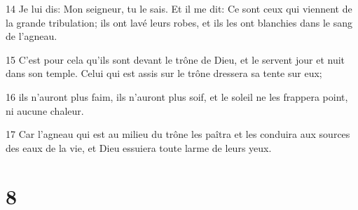 \par 14 Je lui dis: Mon seigneur, tu le sais. Et il me dit: Ce sont ceux qui viennent de la grande tribulation; ils ont lavé leurs robes, et ils les ont blanchies dans le sang de l'agneau.
\par 15 C'est pour cela qu'ils sont devant le trône de Dieu, et le servent jour et nuit dans son temple. Celui qui est assis sur le trône dressera sa tente sur eux;
\par 16 ils n'auront plus faim, ils n'auront plus soif, et le soleil ne les frappera point, ni aucune chaleur.
\par 17 Car l'agneau qui est au milieu du trône les paîtra et les conduira aux sources des eaux de la vie, et Dieu essuiera toute larme de leurs yeux.

\chapter{8}

